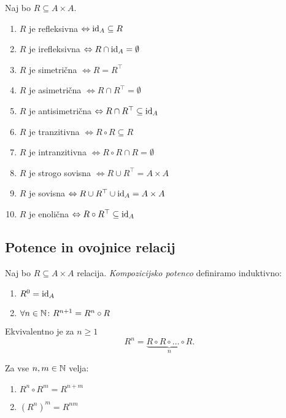 \documentclass[12pt, a4paper]{article}
\renewcommand{\iff}{\Leftrightarrow}
\begin{document}
\begin{izrek}
Naj bo $R\subseteq A\times A$.

\begin{enumerate}
\item $R$ je refleksivna $\iff\id_A\subseteq R$
\item $R$ je irefleksivna $\iff R\cap\id_A=\emptyset$
\item $R$ je simetrična $\iff R=R^\top$
\item $R$ je asimetrična $\iff R\cap R^\top=\emptyset$
\item $R$ je antisimetrična $\iff R\cap R^\top\subseteq\id_A$
\item $R$ je tranzitivna $\iff R\circ R\subseteq R$
\item $R$ je intranzitivna $\iff R\circ R\cap R=\emptyset$
\item $R$ je strogo sovisna $\iff R\cup R^\top=A\times A$
\item $R$ je sovisna $\iff R\cup R^\top\cup\id_A=A\times A$
\item $R$ je enolična $\iff R\circ R^\top\subseteq\id_A$
\end{enumerate}
\end{izrek}

\obvs

\newpage

\subsection{Potence in ovojnice relacij}

\begin{okvir}
\begin{definicija}
Naj bo $R\subseteq A\times A$ relacija. \emph{Kompozicijsko potenco} definiramo induktivno:

\begin{enumerate}
\item $R^0=\operatorname{id}_A$
\item $\forall n\in\mathbb{N}\colon R^{n+1}=R^n\circ R$
\end{enumerate}

Ekvivalentno je za $n\geq 1$
\[
R^n=\underbrace{R\circ R\circ\dots\circ R}_n.
\]
\end{definicija}
\end{okvir}

\begin{trditev}
Za vse $n,m\in\mathbb{N}$ velja:

\begin{enumerate}
\item $R^n\circ R^m=R^{n+m}$
\item $(R^n)^m=R^{nm}$
\end{enumerate}
\end{trditev}
\end{document}

